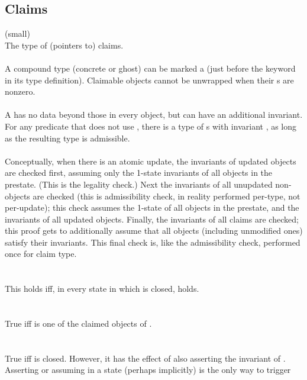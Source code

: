 \documentclass[preprint,nocopyrightspace]{sigplanconf}
\begin{document}
{{{\subsection{Claims}
\vcc{\claim} (small)\\
The type of (pointers to) claims. 
\\\\
A compound type (concrete or ghost) can be marked a  (just before
the  keyword in its type definition). Claimable objects
cannot be unwrapped when their s are nonzero.
\\\\
A \vcc{\claim} has no data beyond those in every object, but can have
an additional invariant. For any predicate  that does not
use \vcc{\old()}, there is a type of \vcc{\claim}s with
invariant , as long as the resulting type is admissible.
\\\\
Conceptually, when there is an atomic update, the invariants of
updated objects are checked first, assuming only the 1-state invariants of
all objects in the prestate. (This is the legality check.)
Next the invariants of all unupdated non-\vcc{\claim} objects are
checked (this is admissibility check, in reality performed per-type, not per-update);
this check assumes the 1-state of all objects in the
prestate, and the invariants of all updated objects. Finally, the
invariants of all claims are checked; this proof gets to additionally
assume that all objects (including unmodified ones) satisfy their invariants.
This final check is, like the admissibility check, performed once
for claim type.
\\\\
\noindent{}\\
This holds iff, in every  state in which  is
closed,  holds. 
\\\\
\noindent{}\\
True iff  is one of the claimed objects of .
\\\\
\noindent{}\\
True iff  is closed. However, it has the effect of also
asserting the invariant of . Asserting or assuming 
in a state (perhaps implicitly) is the only way to trigger
}}}
\end{document}
